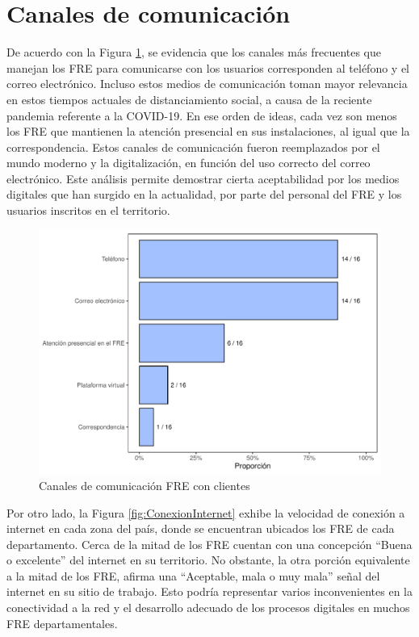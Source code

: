 \documentclass[
]{book}
\begin{document}
\hypertarget{canales-de-comunicaciuxf3n}{%
\section{Canales de comunicación}\label{canales-de-comunicaciuxf3n}}

De acuerdo con la Figura \ref{fig:MediosComunicacion}, se evidencia que los canales más frecuentes que manejan los FRE para comunicarse con los usuarios corresponden al teléfono y el correo electrónico. Incluso estos medios de comunicación toman mayor relevancia en estos tiempos actuales de distanciamiento social, a causa de la reciente pandemia referente a la COVID-19. En ese orden de ideas, cada vez son menos los FRE que mantienen la atención presencial en sus instalaciones, al igual que la correspondencia. Estos canales de comunicación fueron reemplazados por el mundo moderno y la digitalización, en función del uso correcto del correo electrónico. Este análisis permite demostrar cierta aceptabilidad por los medios digitales que han surgido en la actualidad, por parte del personal del FRE y los usuarios inscritos en el territorio.

\begin{figure}
\includegraphics[width=0.85\linewidth]{InformeFinal_files/figure-latex/MediosComunicacion-1} \caption{Canales de comunicación FRE con clientes}\label{fig:MediosComunicacion}
\end{figure}

Por otro lado, la Figura \ref{fig:ConexionInternet} exhibe la velocidad de conexión a internet en cada zona del país, donde se encuentran ubicados los FRE de cada departamento. Cerca de la mitad de los FRE cuentan con una concepción ``Buena o excelente'' del internet en su territorio. No obstante, la otra porción equivalente a la mitad de los FRE, afirma una ``Aceptable, mala o muy mala'' señal del internet en su sitio de trabajo. Esto podría representar varios inconvenientes en la conectividad a la red y el desarrollo adecuado de los procesos digitales en muchos FRE departamentales.
\end{document}
